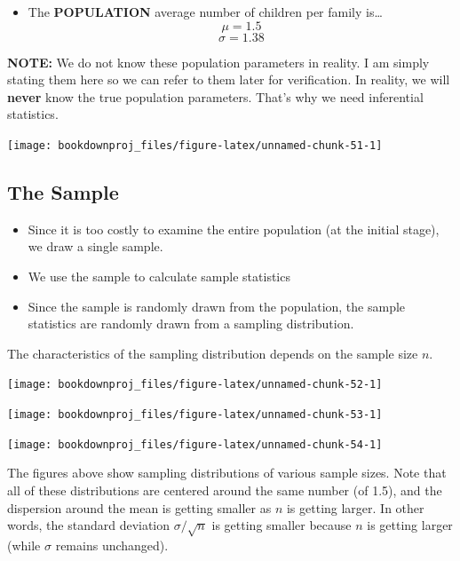 \documentclass[
]{book}
\providecommand{\tightlist}{%
  \setlength{\itemsep}{0pt}\setlength{\parskip}{0pt}}
\begin{document}
\begin{itemize}
\tightlist
\item
  The \textbf{POPULATION} average number of children per family is\ldots{}
  \[\mu = 1.5\]
  \[\sigma = 1.38\]
\end{itemize}

\textbf{NOTE:} We do not know these population parameters in reality. I am simply stating them here so we can refer to them later for verification. In reality, we will \textbf{never} know the true population parameters. That's why we need inferential statistics.

\begin{center}\texttt{[image: bookdownproj\_files/figure-latex/unnamed-chunk-51-1]} \end{center}

\hypertarget{the-sample}{%
\subsection{The Sample}\label{the-sample}}

\begin{itemize}
\item
  Since it is too costly to examine the entire population (at the initial stage), we draw a single sample.
\item
  We use the sample to calculate sample statistics
\item
  Since the sample is randomly drawn from the population, the sample statistics are randomly drawn from a sampling distribution.
\end{itemize}

The characteristics of the sampling distribution depends on the sample size \(n\).

\begin{center}\texttt{[image: bookdownproj\_files/figure-latex/unnamed-chunk-52-1]} \end{center}

\begin{center}\texttt{[image: bookdownproj\_files/figure-latex/unnamed-chunk-53-1]} \end{center}

\begin{center}\texttt{[image: bookdownproj\_files/figure-latex/unnamed-chunk-54-1]} \end{center}

The figures above show sampling distributions of various sample sizes. Note that all of these distributions are centered around the same number (of 1.5), and the dispersion around the mean is getting smaller as \(n\) is getting larger. In other words, the standard deviation \(\sigma / \sqrt{n}\) is getting smaller because \(n\) is getting larger (while \(\sigma\) remains unchanged).
\end{document}
